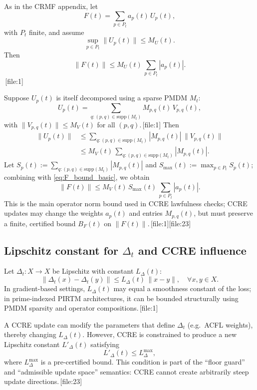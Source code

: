 \documentclass[11pt]{article}
\begin{document}
As in the CRMF appendix, let
\[
  F(t) = \sum_{p\in P_t} a_p(t)\,U_p(t),
\]
with $P_t$ finite, and assume
\[
  \sup_{p\in P_t} \|U_p(t)\| \le M_U(t).
\]
Then
\begin{equation}
  \|F(t)\| \le M_U(t)\,\sum_{p\in P_t} |a_p(t)|.\label{eq:F_bound_basic}
\end{equation}
\,[file:1]

Suppose $U_p(t)$ is itself decomposed using a sparse PMDM $M_t$:
\[
  U_p(t) = \sum_{q:(p,q)\in\mathrm{supp}(M_t)} M_{p,q}(t)\,V_{p,q}(t),
\]
with $\|V_{p,q}(t)\|\le M_V(t)$ for all $(p,q)$.\,[file:1]
Then
\begin{align*}
  \|U_p(t)\|
  &\le \sum_{q:(p,q)\in\mathrm{supp}(M_t)} |M_{p,q}(t)|\,\|V_{p,q}(t)\| \\
  &\le M_V(t)\,\sum_{q:(p,q)\in\mathrm{supp}(M_t)} |M_{p,q}(t)|.
\end{align*}
Let $S_p(t) := \sum_{q:(p,q)\in\mathrm{supp}(M_t)} |M_{p,q}(t)|$ and $S_{\max}(t) := \max_{p\in P_t} S_p(t)$; combining with \eqref{eq:F_bound_basic}, we obtain
\begin{equation}
  \|F(t)\| \le M_V(t)\,S_{\max}(t)\,\sum_{p\in P_t} |a_p(t)|.\label{eq:F_bound_PMDM}
\end{equation}
This is the main operator norm bound used in CCRE lawfulness checks; CCRE updates may change the weights $a_p(t)$ and entries $M_{p,q}(t)$, but must preserve a finite, certified bound $B_F(t)$ on $\|F(t)\|$.\,[file:1][file:23]

\subsection{Lipschitz constant for $\Delta_t$ and CCRE influence}

Let $\Delta_t : X\to X$ be Lipschitz with constant $L_\Delta(t)$:
\[
  \|\Delta_t(x) - \Delta_t(y)\| \le L_\Delta(t)\,\|x-y\|, \quad \forall x,y\in X.
\]
In gradient-based settings, $L_\Delta(t)$ may equal a smoothness constant of the loss; in prime-indexed PIRTM architectures, it can be bounded structurally using PMDM sparsity and operator compositions.\,[file:1]

A CCRE update can modify the parameters that define $\Delta_t$ (e.g.\ ACFL weights), thereby changing $L_\Delta(t)$.
However, CCRE is constrained to produce a new Lipschitz constant $L'_\Delta(t)$ satisfying
\begin{equation}
  L'_\Delta(t) \le L^{\max}_\Delta,\label{eq:L_delta_bound}
\end{equation}
where $L^{\max}_\Delta$ is a pre-certified bound.
This condition is part of the ``floor guard'' and ``admissible update space'' semantics: CCRE cannot create arbitrarily steep update directions.\,[file:23]
\end{document}
